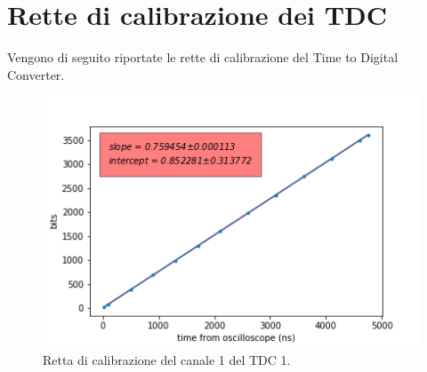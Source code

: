 \begin{figure}[H]
	\centering
	\quad
	\quad
	\quad
	\quad
\end{figure}
\chapter{Rette di calibrazione dei TDC}               %
Vengono di seguito riportate le rette di calibrazione del Time to Digital Converter.

\begin{figure}[H]
  \centering
  \includegraphics[width=.8\textwidth]{plots/tdc11.png}
  \caption{Retta di calibrazione del canale 1 del TDC 1.}
  \label{fig:tdc11}
\end{figure}


